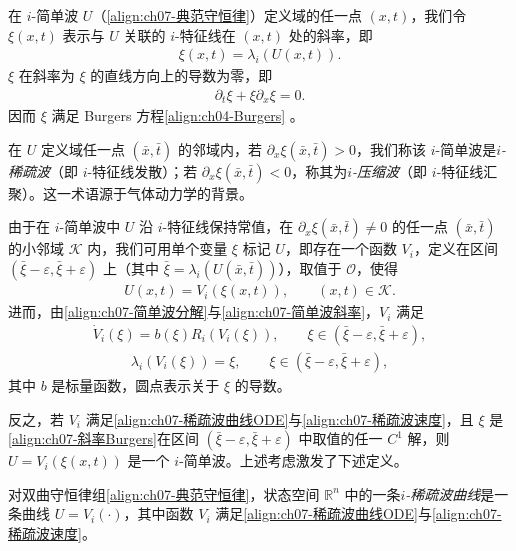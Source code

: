 \documentclass[../../main.tex]{subfiles}
\begin{document}
在 $i$-简单波 $U$（\eqref{align:ch07-典范守恒律}）定义域的任一点 $(x,t)$，我们令 $\xi(x,t)$ 表示与 $U$ 关联的 $i$-特征线在 $(x,t)$ 处的斜率，即
\begin{align}
\xi(x,t)=\lambda_i(U(x,t)).
\label{align:ch07-简单波斜率}
\end{align}
$\xi$ 在斜率为 $\xi$ 的直线方向上的导数为零，即
\begin{align}
\partial_t\xi+\xi\partial_x\xi=0.
\label{align:ch07-斜率Burgers}
\end{align}
因而 $\xi$ 满足 Burgers 方程\eqref{align:ch04-Burgers}
。

在 $U$ 定义域任一点 $(\bar{x},\bar{t})$ 的邻域内，若 $\partial_x\xi(\bar{x},\bar{t})>0$，我们称该 $i$-简单波是\emph{$i$-稀疏波}（即 $i$-特征线发散）；若 $\partial_x\xi(\bar{x},\bar{t})<0$，称其为\emph{$i$-压缩波}（即 $i$-特征线汇聚）。这一术语源于气体动力学的背景。

由于在 $i$-简单波中 $U$ 沿 $i$-特征线保持常值，在 $\partial_x\xi(\bar{x},\bar{t})\neq 0$ 的任一点 $(\bar{x},\bar{t})$ 的小邻域 $\mathscr{K}$ 内，我们可用单个变量 $\xi$ 标记 $U$，即存在一个函数 $V_i$，定义在区间 $(\bar{\xi}-\varepsilon,\bar{\xi}+\varepsilon)$ 上（其中 $\bar{\xi}=\lambda_i(U(\bar{x},\bar{t}))$），取值于 $\mathscr{O}$，使得
\begin{align}
U(x,t)=V_i(\xi(x,t)),\qquad (x,t)\in\mathscr{K}.
\label{align:ch07-简单波参数化}
\end{align}
进而，由\eqref{align:ch07-简单波分解}与\eqref{align:ch07-简单波斜率}，$V_i$ 满足
\begin{align}
\dot{V}_i(\xi)=b(\xi)R_i(V_i(\xi)),\qquad \xi\in(\bar{\xi}-\varepsilon,\bar{\xi}+\varepsilon),
\label{align:ch07-稀疏波曲线ODE}
\end{align}
\begin{align}
\lambda_i(V_i(\xi))=\xi,\qquad \xi\in(\bar{\xi}-\varepsilon,\bar{\xi}+\varepsilon),
\label{align:ch07-稀疏波速度}
\end{align}
其中 $b$ 是标量函数，圆点表示关于 $\xi$ 的导数。

反之，若 $V_i$ 满足\eqref{align:ch07-稀疏波曲线ODE}与\eqref{align:ch07-稀疏波速度}，且 $\xi$ 是\eqref{align:ch07-斜率Burgers}在区间 $(\bar{\xi}-\varepsilon,\bar{\xi}+\varepsilon)$ 中取值的任一 $C^1$ 解，则 $U=V_i(\xi(x,t))$ 是一个 $i$-简单波。上述考虑激发了下述定义。

\begin{definition}[$i$-稀疏波曲线]\label{definition:ch07-稀疏波曲线}
对双曲守恒律组\eqref{align:ch07-典范守恒律}，状态空间 $\mathbb{R}^n$ 中的一条\emph{$i$-稀疏波曲线}是一条曲线 $U=V_i(\cdot)$，其中函数 $V_i$ 满足\eqref{align:ch07-稀疏波曲线ODE}与\eqref{align:ch07-稀疏波速度}。
\end{definition}
\end{document}
